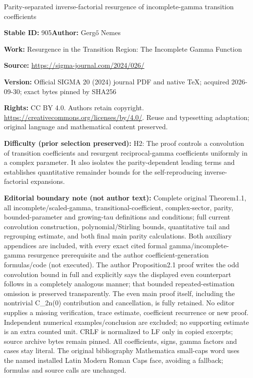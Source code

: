\documentclass[11pt]{article}
\numberwithin{equation}{section}
\numberwithin{equation}{section}
\begin{document}
\begin{center}\Large Parity-separated inverse-factorial resurgence of incomplete-gamma transition coefficients\end{center}
\noindent\textbf{Stable ID:} 905\quad\textbf{Author:} Gergő Nemes\par
\noindent\textbf{Work:} Resurgence in the Transition Region: The Incomplete Gamma Function\par
\noindent\textbf{Source:} \url{https://sigma-journal.com/2024/026/}\par
\noindent\textbf{Version:} Official SIGMA 20 (2024) journal PDF and native TeX; acquired 2026-09-30; exact bytes pinned by SHA256\par
\noindent\textbf{Rights:} CC BY 4.0. Authors retain copyright. \url{https://creativecommons.org/licenses/by/4.0/}. Reuse and typesetting adaptation; original language and mathematical content preserved.\par
\noindent\textbf{Difficulty (prior selection preserved):} {\CJKfont H2: The proof controls a convolution of transition coefficients and resurgent reciprocal-gamma coefficients uniformly in a complex parameter. It also isolates the parity-dependent leading terms and establishes quantitative remainder bounds for the self-reproducing inverse-factorial expansions.}\par
\medskip\noindent\textbf{Editorial boundary note (not author text):} Complete original Theorem1.1, all incomplete/scaled-gamma, transitional-coefficient, complex-sector, parity, bounded-parameter and growing-tau definitions and conditions; full current convolution construction, polynomial/Stirling bounds, quantitative tail and regrouping estimate, and both final main parity calculations. Both auxiliary appendices are included, with every exact cited formal gamma/incomplete-gamma resurgence prerequisite and the author coefficient-generation formulas/code (not executed). The author Proposition2.1 proof writes the odd convolution bound in full and explicitly says the displayed even counterpart follows in a completely analogous manner; that bounded repeated-estimation omission is preserved transparently. The even main proof itself, including the nontrivial C\_2n(0) contribution and cancellation, is fully retained. No editor supplies a missing verification, trace estimate, coefficient recurrence or new proof. Independent numerical examples/conclusion are excluded; no supporting estimate is an extra counted unit. CRLF is normalized to LF only in copied excerpts; source archive bytes remain pinned. All coefficients, signs, gamma factors and cases stay literal. The original bibliography Mathematica small-caps word uses the named installed Latin Modern Roman Caps face, avoiding a fallback; formulas and source calls are unchanged.\par
\end{document}
